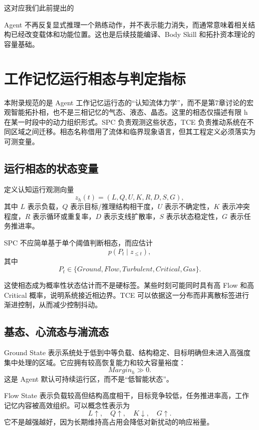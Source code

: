 这对应我们此前提出的
\begin{statementbox}
\centering
{}
\end{statementbox}
Agent 不再反复显式推理一个熟练动作，并不表示能力消失，而通常意味着相关结构已经改变载体和功能位置。这也是后续技能编译、Body Skill 和拓扑资本理论的容量基础。


\chapter{工作记忆运行相态与判定指标}
\label{app:phase}

\begin{chapterlead}
本附录规范的是 Agent 工作记忆运行态的“认知流体力学”，而不是第7章讨论的宏观智能拓扑相，也不是三相记忆的气态、液态、晶态。这里的相态仅描述有限 h 在某一时段中的动力组织形式。SPC 负责观测这些状态，TCE 负责推动系统在不同区域之间迁移。相态名称借用了流体和临界现象语言，但其工程定义必须落实为可测变量。
\end{chapterlead}

\section{运行相态的状态变量}

定义认知运行观测向量
\[
z_h(t)
=
(
L,
Q,
U,
K,
R,
D,
S,
G
),
\]
其中 $L$ 表示负载，$Q$ 表示目标/推理结构相干度，$U$ 表示不确定性，$K$ 表示冲突程度，$R$ 表示循环或重复率，$D$ 表示支线扩散率，$S$ 表示状态稳定性，$G$ 表示任务推进率。

SPC 不应简单基于单个阈值判断相态，而应估计
\[
p(P_t\mid z_{\le t}),
\]
其中
\[
P_t
\in
\{
Ground,
Flow,
Turbulent,
Critical,
Gas
\}.
\]

这使相态成为概率性状态估计而不是硬标签。某些时刻可能同时具有高 Flow 和高 Critical 概率，说明系统接近相边界。TCE 可以依据这一分布而非离散标签进行渐进控制，从而减少控制抖动。

\section{基态、心流态与湍流态}

Ground State 表示系统处于低到中等负载、结构稳定、目标明确但未进入高强度集中处理的区域。它应拥有较高恢复能力和较大容量裕度：
\[
Margin_h\gg0.
\]
这是 Agent 默认可持续运行区，而不是“低智能状态”。

Flow State 表示负载较高但结构高度相干，目标竞争较低，任务推进率高，工作记忆内容被高效组织。可以概念性表示为
\[
L\uparrow,\quad
Q\uparrow,\quad
K\downarrow,\quad
G\uparrow.
\]
它不是越强越好，因为长期维持高占用会降低对新扰动的响应裕量。

